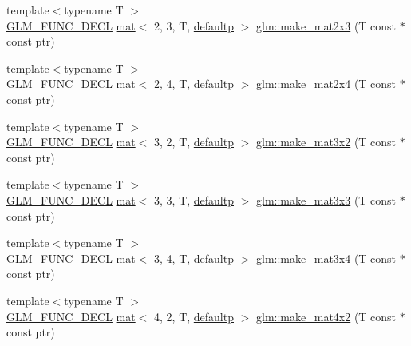 \begin{DoxyCompactItemize}
\item 
{\footnotesize template$<$typename T $>$ }\\\hyperlink{setup_8hpp_ab2d052de21a70539923e9bcbf6e83a51}{G\+L\+M\+\_\+\+F\+U\+N\+C\+\_\+\+D\+E\+CL} \hyperlink{structglm_1_1mat}{mat}$<$ 2, 3, T, \hyperlink{namespaceglm_a36ed105b07c7746804d7fdc7cc90ff25a9d21ccd8b5a009ec7eb7677befc3bf51}{defaultp} $>$ \hyperlink{group__gtc__type__ptr_ga21982104164789cf8985483aaefc25e8}{glm\+::make\+\_\+mat2x3} (T const $\ast$const ptr)
\item 
{\footnotesize template$<$typename T $>$ }\\\hyperlink{setup_8hpp_ab2d052de21a70539923e9bcbf6e83a51}{G\+L\+M\+\_\+\+F\+U\+N\+C\+\_\+\+D\+E\+CL} \hyperlink{structglm_1_1mat}{mat}$<$ 2, 4, T, \hyperlink{namespaceglm_a36ed105b07c7746804d7fdc7cc90ff25a9d21ccd8b5a009ec7eb7677befc3bf51}{defaultp} $>$ \hyperlink{group__gtc__type__ptr_ga078b862c90b0e9a79ed43a58997d8388}{glm\+::make\+\_\+mat2x4} (T const $\ast$const ptr)
\item 
{\footnotesize template$<$typename T $>$ }\\\hyperlink{setup_8hpp_ab2d052de21a70539923e9bcbf6e83a51}{G\+L\+M\+\_\+\+F\+U\+N\+C\+\_\+\+D\+E\+CL} \hyperlink{structglm_1_1mat}{mat}$<$ 3, 2, T, \hyperlink{namespaceglm_a36ed105b07c7746804d7fdc7cc90ff25a9d21ccd8b5a009ec7eb7677befc3bf51}{defaultp} $>$ \hyperlink{group__gtc__type__ptr_ga27a24e121dc39e6857620e0f85b6e1a8}{glm\+::make\+\_\+mat3x2} (T const $\ast$const ptr)
\item 
{\footnotesize template$<$typename T $>$ }\\\hyperlink{setup_8hpp_ab2d052de21a70539923e9bcbf6e83a51}{G\+L\+M\+\_\+\+F\+U\+N\+C\+\_\+\+D\+E\+CL} \hyperlink{structglm_1_1mat}{mat}$<$ 3, 3, T, \hyperlink{namespaceglm_a36ed105b07c7746804d7fdc7cc90ff25a9d21ccd8b5a009ec7eb7677befc3bf51}{defaultp} $>$ \hyperlink{group__gtc__type__ptr_gaf2e8337b15c3362aaeb6e5849e1c0536}{glm\+::make\+\_\+mat3x3} (T const $\ast$const ptr)
\item 
{\footnotesize template$<$typename T $>$ }\\\hyperlink{setup_8hpp_ab2d052de21a70539923e9bcbf6e83a51}{G\+L\+M\+\_\+\+F\+U\+N\+C\+\_\+\+D\+E\+CL} \hyperlink{structglm_1_1mat}{mat}$<$ 3, 4, T, \hyperlink{namespaceglm_a36ed105b07c7746804d7fdc7cc90ff25a9d21ccd8b5a009ec7eb7677befc3bf51}{defaultp} $>$ \hyperlink{group__gtc__type__ptr_ga05dd66232aedb993e3b8e7b35eaf932b}{glm\+::make\+\_\+mat3x4} (T const $\ast$const ptr)
\item 
{\footnotesize template$<$typename T $>$ }\\\hyperlink{setup_8hpp_ab2d052de21a70539923e9bcbf6e83a51}{G\+L\+M\+\_\+\+F\+U\+N\+C\+\_\+\+D\+E\+CL} \hyperlink{structglm_1_1mat}{mat}$<$ 4, 2, T, \hyperlink{namespaceglm_a36ed105b07c7746804d7fdc7cc90ff25a9d21ccd8b5a009ec7eb7677befc3bf51}{defaultp} $>$ \hyperlink{group__gtc__type__ptr_ga8b34c9b25bf3310d8ff9c828c7e2d97c}{glm\+::make\+\_\+mat4x2} (T const $\ast$const ptr)

\end{DoxyCompactItemize}
